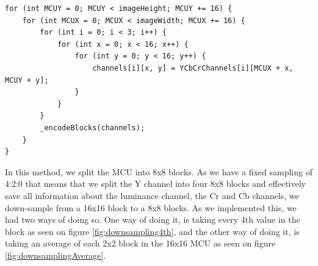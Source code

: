 \begin{lstlisting}[firstnumber=525, label=JPEGEncodeAndQuantize, caption={Shows how the image is divided into MCUs \textbf{File: }JPEGImage.cs}]
for (int MCUY = 0; MCUY < imageHeight; MCUY += 16) {
    for (int MCUX = 0; MCUX < imageWidth; MCUX += 16) {
        for (int i = 0; i < 3; i++) {
            for (int x = 0; x < 16; x++) {
                for (int y = 0; y < 16; y++) {
                    channels[i][x, y] = YCbCrChannels[i][MCUX + x, MCUY + y];
                }
            }
        }
        _encodeBlocks(channels);
    }
}
\end{lstlisting}

In this method, we split the MCU into 8x8 blocks.
As we have a fixed sampling of 4:2:0 that means that we split the Y channel into four 8x8 blocks and effectively save all information about the luminance channel, the Cr and Cb channels, we down-sample from a 16x16 block to a 8x8 blocks.
As we implemented this, we had two ways of doing so.
One way of doing it, is taking every 4th value in the block as seen on figure \ref{fig:downsampling4th}, and the other way of doing it, is taking an average of each 2x2 block in the 16x16 MCU as seen on figure \ref{fig:downsamplingAverage}.

